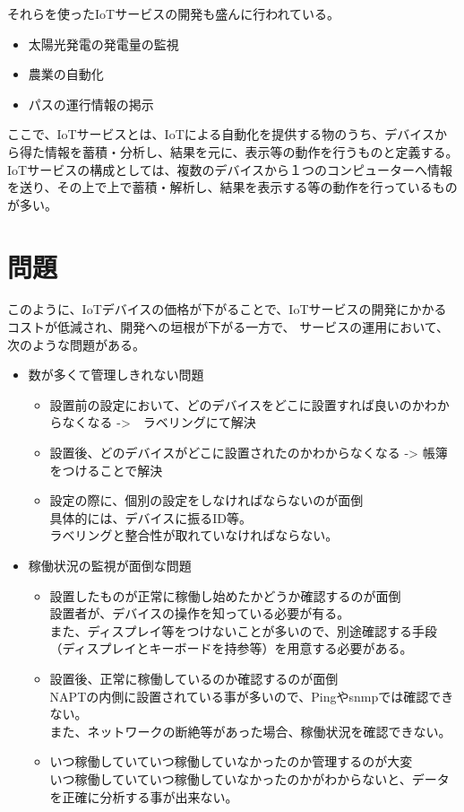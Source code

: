 それらを使ったIoTサービスの開発も盛んに行われている。
\begin{itemize}
\item 太陽光発電の発電量の監視
\item 農業の自動化
\item パスの運行情報の掲示
\end{itemize}

ここで、IoTサービスとは、IoTによる自動化を提供する物のうち、デバイスから得た情報を蓄積・分析し、結果を元に、表示等の動作を行うものと定義する。
IoTサービスの構成としては、複数のデバイスから１つのコンピューターへ情報を送り、その上で上で蓄積・解析し、結果を表示する等の動作を行っているものが多い。

\section{問題}
このように、IoTデバイスの価格が下がることで、IoTサービスの開発にかかるコストが低減され、開発への垣根が下がる一方で、
サービスの運用において、次のような問題がある。
\begin{itemize}
	\item 数が多くて管理しきれない問題
	\begin{itemize}
		\item 設置前の設定において、どのデバイスをどこに設置すれば良いのかわからなくなる ->　ラベリングにて解決
		\item 設置後、どのデバイスがどこに設置されたのかわからなくなる -> 帳簿をつけることで解決
		\item 設定の際に、個別の設定をしなければならないのが面倒\\
			具体的には、デバイスに振るID等。\\
			ラベリングと整合性が取れていなければならない。
	\end{itemize}
	\item 稼働状況の監視が面倒な問題
	\begin{itemize}
		\item 設置したものが正常に稼働し始めたかどうか確認するのが面倒\\
			設置者が、デバイスの操作を知っている必要が有る。\\
			また、ディスプレイ等をつけないことが多いので、別途確認する手段（ディスプレイとキーボードを持参等）を用意する必要がある。
		\item 設置後、正常に稼働しているのか確認するのが面倒\\
			NAPTの内側に設置されている事が多いので、Pingやsnmpでは確認できない。\\
			また、ネットワークの断絶等があった場合、稼働状況を確認できない。
		\item いつ稼働していていつ稼働していなかったのか管理するのが大変\\
			いつ稼働していていつ稼働していなかったのかがわからないと、データを正確に分析する事が出来ない。
	\end{itemize}
\end{itemize}

